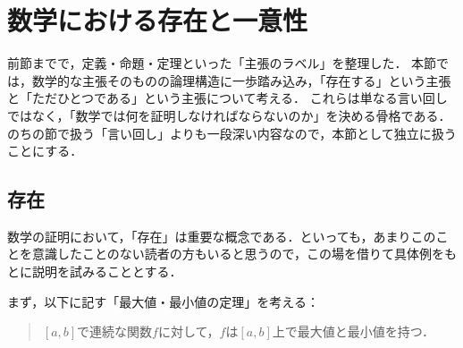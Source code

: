 \section{数学における存在と一意性}

前節までで，定義・命題・定理といった「主張のラベル」を整理した．
本節では，数学的な主張そのものの論理構造に一歩踏み込み，「存在する」という主張と「ただひとつである」という主張について考える．
これらは単なる言い回しではなく，「数学では何を証明しなければならないのか」を決める骨格である．
のちの節で扱う「言い回し」よりも一段深い内容なので，本節として独立に扱うことにする．

\subsection{存在}

数学の証明において，「存在」は重要な概念である．といっても，あまりこのことを意識したことのない読者の方もいると思うので，この場を借りて具体例をもとに説明を試みることとする．

まず，以下に記す「最大値・最小値の定理」を考える：
\begin{quotation}
  $[a,b]$で連続な関数$f$に対して，$f$は$[a,b]$上で最大値と最小値を持つ．
\end{quotation}

